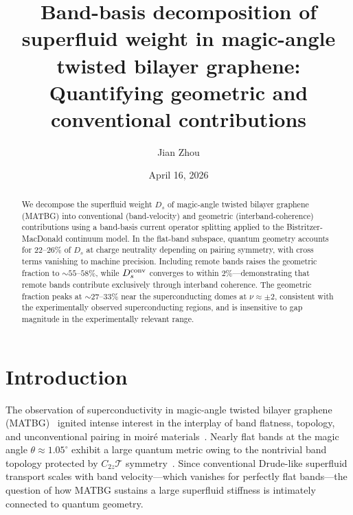 \documentclass[prb,twocolumn,superscriptaddress,floatfix]{revtex4-2}
\begin{document}
\title{Band-basis decomposition of superfluid weight in magic-angle twisted bilayer graphene: Quantifying geometric and conventional contributions}

\author{Jian Zhou}

\date{April 16, 2026}

\begin{abstract}
We decompose the superfluid weight $D_s$ of magic-angle twisted bilayer graphene (MATBG) into conventional (band-velocity) and geometric (interband-coherence) contributions using a band-basis current operator splitting applied to the Bistritzer-MacDonald continuum model.
In the flat-band subspace, quantum geometry accounts for $22$--$26\%$ of $D_s$ at charge neutrality depending on pairing symmetry, with cross terms vanishing to machine precision.
Including remote bands raises the geometric fraction to ${\sim}55$--$58\%$, while $D_s^{\rm conv}$ converges to within $2\%$---demonstrating that remote bands contribute exclusively through interband coherence.
The geometric fraction peaks at ${\sim}27$--$33\%$ near the superconducting domes at $\nu \approx \pm 2$, consistent with the experimentally observed superconducting regions, and is insensitive to gap magnitude in the experimentally relevant range.
\end{abstract}

\maketitle

\section{Introduction}

The observation of superconductivity in magic-angle twisted bilayer graphene (MATBG)~\cite{cao_sc_2018} ignited intense interest in the interplay of band flatness, topology, and unconventional pairing in moir\'e materials~\cite{cao_insulator_2018,yankowitz_2019}.
Nearly flat bands at the magic angle $\theta \approx 1.05^\circ$ exhibit a large quantum metric owing to the nontrivial band topology protected by $C_{2z}\mathcal{T}$ symmetry~\cite{song_2019,po_2019}.
Since conventional Drude-like superfluid transport scales with band velocity---which vanishes for perfectly flat bands---the question of how MATBG sustains a large superfluid stiffness is intimately connected to quantum geometry.
\end{document}
